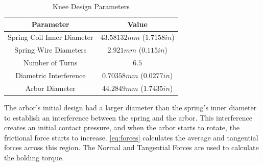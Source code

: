 \begin{table}[h!]
\centering
 \begin{tabular}{|c || c|} 
 \hline
 Parameter & Value  \\ [0.5ex] 
 \hline\hline
 Spring Coil Inner Diameter   & $43.58132mm$ ($1.7158in$)   \\
\hline
Spring Wire Diameters &   $2.921mm$  ($0.115in$)  \\
\hline
Number of Turns     &   $6.5$ \\
\hline
Diametric Interference    &   $0.70358mm$ ($0.0277in$) \\
 \hline
  Arbor Diameter &  $44.2849mm$ ($1.7435 in$) \\ [1ex]
 \hline
 \end{tabular}
\caption[Knee Parameters]{Knee Design Parameters}
\label{tab:KneeDesign}
\end{table}






The arbor's initial design had a larger diameter than the spring's inner diameter to establish an interference between the spring and the arbor. This interference creates an initial contact pressure, and when the arbor starts to rotate, the frictional force starts to increase. \autoref{eq:forces}  calculates the average and tangential forces across this region. The Normal and Tangential Forces are used to calculate the holding torque.

